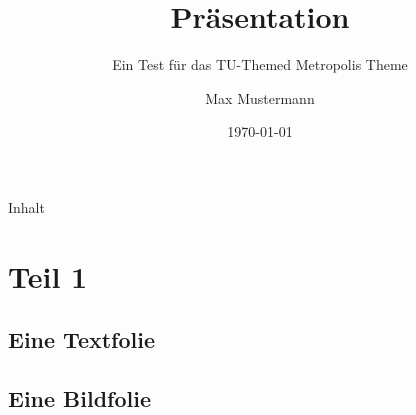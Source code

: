 \documentclass[aspectratio=1610]{../tuprolis}
\title{Präsentation}
\subtitle{Ein Test für das TU-Themed Metropolis Theme}
\institute{Dortmund Corp}
\author{Max Mustermann}
\date{\today}
\begin{document}
	
\frame[plain]{\titlepage} 

\begin{frame}[plain]{Inhalt}
	\tableofcontents
\end{frame}


\section{Teil 1}

\subsection{Eine Textfolie}


\subsection{Eine Bildfolie}

\end{document}
